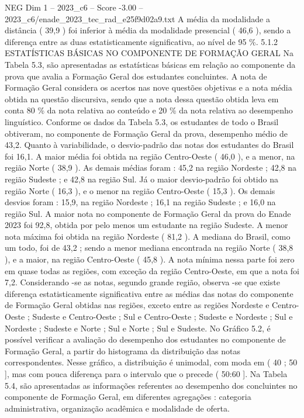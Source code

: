 \begin{textsample}{NEG Dim 1 – 2023\_c6 – Score -3.00 – 2023\_c6/enade\_2023\_tec\_rad\_e25f9d02a9.txt}
A média da modalidade a distância ( 39,9 ) foi inferior à média da modalidade presencial ( 46,6 ), sendo a diferença entre as duas estatisticamente significativa, ao nível de 95 \%. 5.1.2 ESTATÍSTICAS BÁSICAS NO COMPONENTE DE FORMAÇÃO GERAL Na Tabela 5.3, são apresentadas as estatísticas básicas em relação ao componente da prova que avalia a Formação Geral dos estudantes concluintes.
A nota de Formação Geral considera os acertos nas nove questões objetivas e a nota média obtida na questão discursiva, sendo que a nota dessa questão obtida leva em conta 80 \% da nota relativa ao conteúdo e 20 \% da nota relativa ao desempenho linguístico.
Conforme os dados da Tabela 5.3, os estudantes de todo o Brasil obtiveram, no componente de Formação Geral da prova, desempenho médio de 43,2.
Quanto à variabilidade, o desvio-padrão das notas dos estudantes do Brasil foi 16,1.
A maior média foi obtida na região Centro-Oeste ( 46,0 ), e a menor, na região Norte ( 38,9 ).
As demais médias foram : 45,2 na região Nordeste ; 42,8 na região Sudeste ; e 42,8 na região Sul.
Já o maior desvio-padrão foi obtido na região Norte ( 16,3 ), e o menor na região Centro-Oeste ( 15,3 ).
Os demais desvios foram : 15,9, na região Nordeste ; 16,1 na região Sudeste ; e 16,0 na região Sul.
A maior nota no componente de Formação Geral da prova do Enade 2023 foi 92,8, obtida por pelo menos um estudante na região Sudeste.
A menor nota máxima foi obtida na região Nordeste ( 81,2 ).
A mediana do Brasil, como um todo, foi de 43,2 ; sendo a menor mediana encontrada na região Norte ( 38,8 ), e a maior, na região Centro-Oeste ( 45,8 ).
A nota mínima nessa parte foi zero em quase todas as regiões, com exceção da região Centro-Oeste, em que a nota foi 7,2.
Considerando -se as notas, segundo grande região, observa -se que existe diferença estatisticamente significativa entre as médias das notas do componente de Formação Geral obtidas nas regiões, exceto entre as regiões Nordeste e Centro-Oeste ; Sudeste e Centro-Oeste ; Sul e Centro-Oeste ; Sudeste e Nordeste ; Sul e Nordeste ; Sudeste e Norte ; Sul e Norte ; Sul e Sudeste.
No Gráfico 5.2, é possível verificar a avaliação do desempenho dos estudantes no componente de Formação Geral, a partir do histograma da distribuição das notas correspondentes.
Nesse gráfico, a distribuição é unimodal, com moda em ( 40 ; 50 ], mas com pouca diferença para o intervalo que o precede ( 50:60 ].
Na Tabela 5.4, são apresentadas as informações referentes ao desempenho dos concluintes no componente de Formação Geral, em diferentes agregações : categoria administrativa, organização acadêmica e modalidade de oferta.

\end{textsample}
